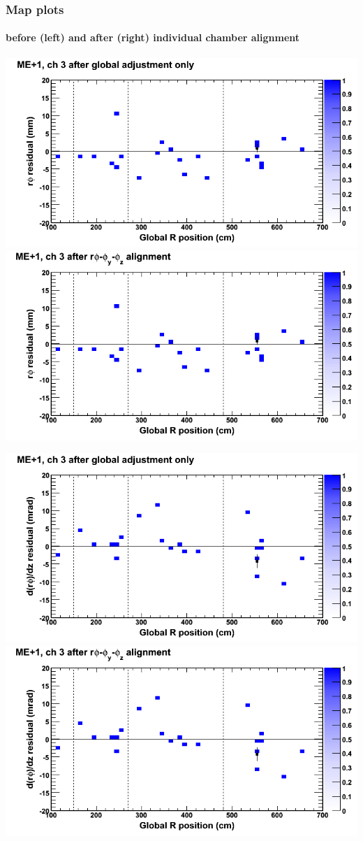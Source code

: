 \documentclass[compress]{beamer}
\begin{document}
\begin{frame}
\frametitle{Map plots}
\framesubtitle{before (left) and after (right) individual chamber alignment}
\includegraphics[width=0.5\linewidth]{ringmapplots_3dof/before_CSCvsr_mep1ch03_x.png} \includegraphics[width=0.5\linewidth]{ringmapplots_3dof/after_CSCvsr_mep1ch03_x.png}

\includegraphics[width=0.5\linewidth]{ringmapplots_3dof/before_CSCvsr_mep1ch03_dxdz.png} \includegraphics[width=0.5\linewidth]{ringmapplots_3dof/after_CSCvsr_mep1ch03_dxdz.png}
\end{frame}
\end{document}
